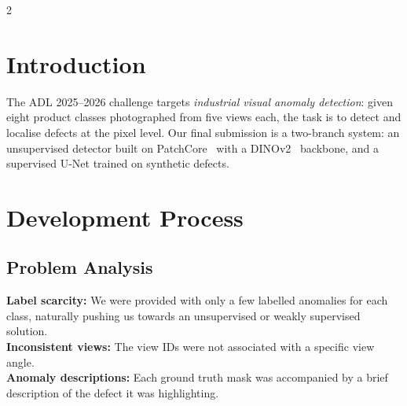 \documentclass[11pt]{article}
\begin{document}
    \begin{multicols}{2}

        \section{Introduction}
        The ADL 2025--2026 challenge targets \textit{industrial visual anomaly
        detection}: given eight product classes photographed from five views
        each, the task is to detect and localise defects at the pixel
        level. 
        Our final submission is a two-branch system: an unsupervised detector built on PatchCore~\cite{roth2022patchcore} with a
        DINOv2~\cite{oquab2024dinov2} backbone, and a supervised U-Net
        \cite{ronneberger2015unet} trained on synthetic defects.

        \section{Development Process}

        \subsection{Problem Analysis}
        \textbf{Label scarcity:} We were provided with only a few labelled anomalies for each class, naturally pushing us towards an unsupervised or weakly supervised solution.\\
        \textbf{Inconsistent views:} The view IDs were not associated with a specific view angle.\\
        \textbf{Anomaly descriptions:} Each ground truth mask was accompanied by a brief description of the defect it was highlighting.
        
        

\end{multicols}
\end{document}
